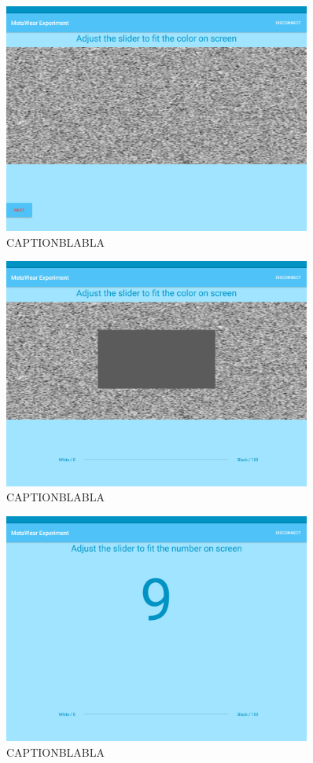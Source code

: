 \begin{figure}[h!]
\centering
\includegraphics[width=0.9\textwidth]{figures/tablet_screen9.png}
\caption{CAPTIONBLABLA}
\label{appendix_app_screen_9}
\end{figure}

\begin{figure}[h!]
\centering
\includegraphics[width=0.9\textwidth]{figures/tablet_screen10.png}
\caption{CAPTIONBLABLA}
\label{appendix_app_screen_10}
\end{figure}

\begin{figure}[h!]
\centering
\includegraphics[width=0.9\textwidth]{figures/tablet_screen11.png}
\caption{CAPTIONBLABLA}
\label{appendix_app_screen_11}
\end{figure}

